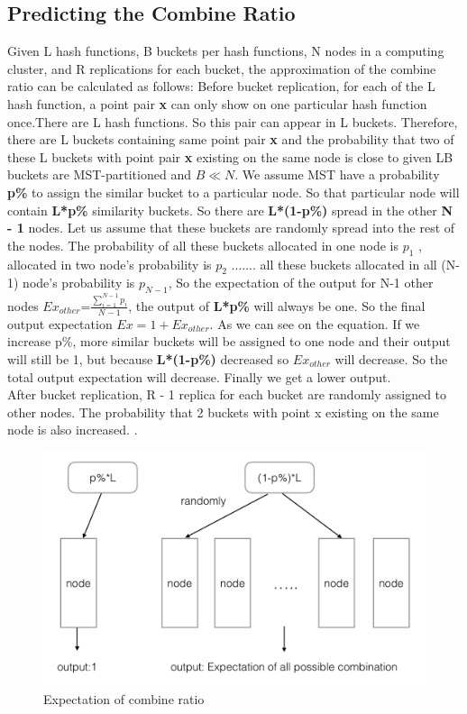 \documentclass{vldb}
\begin{document}
\subsection{Predicting the Combine Ratio}
Given L hash functions, B buckets per hash functions, N nodes in a computing cluster, and R replications for each bucket, the approximation of the combine ratio can be calculated as follows:
Before bucket replication, for each of the L hash function, a point pair \textbf{x} can only show on one particular hash function once.There are L hash functions. So this pair can appear in L buckets. Therefore, there are L buckets containing same point pair \textbf{x}  and the probability  that two of these L buckets with point pair \textbf{x}  existing on the same node is close to  given LB buckets are MST-partitioned and $B \ll N$. We assume MST have a probability \textbf{p\%} to assign the similar bucket to a particular node. So that particular node will contain \textbf{L*p\%} similarity buckets. So there are \textbf{L*(1-p\%)} spread in the other \textbf{N - 1} nodes. Let us assume that these buckets are randomly spread into the rest of the nodes. The probability of all these buckets allocated in one node is \textbf{$p_{1}$} , allocated in two node's probability is \textbf{$p_{2}$} ....... all these buckets allocated in all (N-1) node's probability is \textbf{$p_{N-1}$}, So the expectation of the output for N-1 other nodes $Ex_{other}$=$\frac{\sum_{i=1}^{N-1}p_{i}}{N-1}$, the output of \textbf{L*p\%} will always be one. So the final output expectation $Ex = 1 + Ex_{other}$. As we can see on the equation. If we increase p\%, more similar buckets will be assigned to one node and their output will still be 1, but because \textbf{L*(1-p\%)} decreased so $Ex_{other}$ will decrease. So the total output expectation will decrease. Finally we get a lower output.\\
After bucket replication, R - 1 replica for each bucket are randomly assigned to other nodes. The probability that 2 buckets with point x existing on the same node is also increased. .

\begin{figure}
\centering
\includegraphics[scale=0.12]{fig5}
\caption{Expectation of combine ratio}
\label{fig:fig5}
\end{figure}
\end{document}
